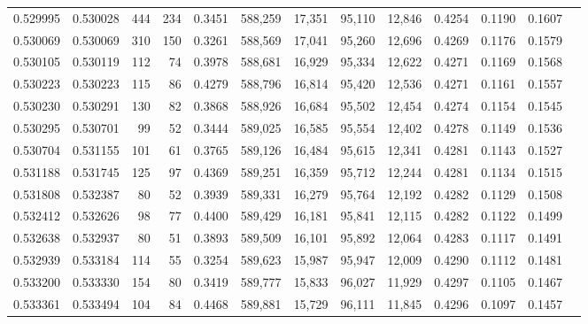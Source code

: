 \begin{tabular}{rrrrrrrrrrrrr}
0.529995 & 0.530028 &   444 &   234 &                                     0.3451 & 588,259 &  17,351 &  95,110 &  12,846 & 0.4254 & 0.1190 & 0.1607 \\
0.530069 & 0.530069 &   310 &   150 &                                     0.3261 & 588,569 &  17,041 &  95,260 &  12,696 & 0.4269 & 0.1176 & 0.1579 \\
0.530105 & 0.530119 &   112 &    74 &                                     0.3978 & 588,681 &  16,929 &  95,334 &  12,622 & 0.4271 & 0.1169 & 0.1568 \\
0.530223 & 0.530223 &   115 &    86 &                                     0.4279 & 588,796 &  16,814 &  95,420 &  12,536 & 0.4271 & 0.1161 & 0.1557 \\
0.530230 & 0.530291 &   130 &    82 &                                     0.3868 & 588,926 &  16,684 &  95,502 &  12,454 & 0.4274 & 0.1154 & 0.1545 \\
0.530295 & 0.530701 &    99 &    52 &                                     0.3444 & 589,025 &  16,585 &  95,554 &  12,402 & 0.4278 & 0.1149 & 0.1536 \\
0.530704 & 0.531155 &   101 &    61 &                                     0.3765 & 589,126 &  16,484 &  95,615 &  12,341 & 0.4281 & 0.1143 & 0.1527 \\
0.531188 & 0.531745 &   125 &    97 &                                     0.4369 & 589,251 &  16,359 &  95,712 &  12,244 & 0.4281 & 0.1134 & 0.1515 \\
0.531808 & 0.532387 &    80 &    52 &                                     0.3939 & 589,331 &  16,279 &  95,764 &  12,192 & 0.4282 & 0.1129 & 0.1508 \\
0.532412 & 0.532626 &    98 &    77 &                                     0.4400 & 589,429 &  16,181 &  95,841 &  12,115 & 0.4282 & 0.1122 & 0.1499 \\
0.532638 & 0.532937 &    80 &    51 &                                     0.3893 & 589,509 &  16,101 &  95,892 &  12,064 & 0.4283 & 0.1117 & 0.1491 \\
0.532939 & 0.533184 &   114 &    55 &                                     0.3254 & 589,623 &  15,987 &  95,947 &  12,009 & 0.4290 & 0.1112 & 0.1481 \\
0.533200 & 0.533330 &   154 &    80 &                                     0.3419 & 589,777 &  15,833 &  96,027 &  11,929 & 0.4297 & 0.1105 & 0.1467 \\
0.533361 & 0.533494 &   104 &    84 &                                     0.4468 & 589,881 &  15,729 &  96,111 &  11,845 & 0.4296 & 0.1097 & 0.1457 \\

\end{tabular}
